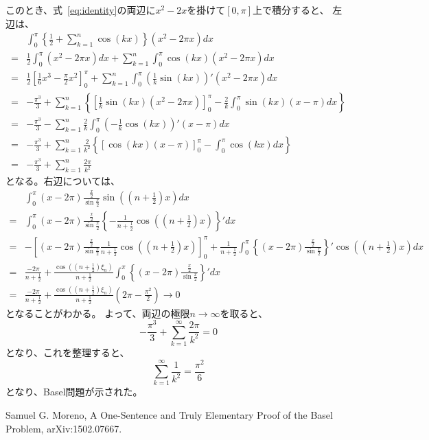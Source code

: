 \documentclass{jsarticle}
\begin{document}
このとき、式~\eqref{eq:identity}の両辺に$x^{2}-2x$を掛けて$[0,\pi]$上で積分すると、
左辺は、
\begin{align}
	&\int_{0}^{\pi}\left\{\frac{1}{2}+\sum_{k=1}^{n}\cos(kx)\right\}(x^{2}-2\pi x)dx\\
	=&\frac{1}{2}\int_{0}^{\pi}(x^{2}-2\pi x)dx+\sum_{k=1}^{n}\int_{0}^{\pi}\cos(kx)(x^2-2\pi x)dx\\
	=&\frac{1}{2}\left[\frac{1}{6}x^{3}-\frac{\pi}{2}x^{2}\right]_{0}^{\pi}
	+\sum_{k=1}^{n}\int_{0}^{\pi}\left(\frac{1}{k}\sin(kx)\right)'(x^{2}-2\pi x)dx\\
	=&-\frac{\pi^{3}}{3}
	+\sum_{k=1}^{n}\left\{\left[\frac{1}{k}\sin(kx)(x^2-2\pi x)\right]_{0}^{\pi}
	-\frac{2}{k}\int_{0}^{\pi}\sin(kx)(x-\pi)dx\right\}\\
	=&-\frac{\pi^{3}}{3}
	-\sum_{k=1}^{n}\frac{2}{k}\int_{0}^{\pi}\left(-\frac{1}{k}\cos(kx)\right)'(x-\pi)dx\\
	=&-\frac{\pi^{3}}{3}+\sum_{k=1}^{n}\frac{2}{k^{2}}
	\left\{\left[\cos(kx)(x-\pi)\right]_{0}^{\pi}
	-\int_{0}^{\pi}\cos(kx)dx
	\right\}\\
	=&-\frac{\pi^{3}}{3}+\sum_{k=1}^{n}\frac{2\pi}{k^{2}}
\end{align}
となる。右辺については、
\begin{align}
	&\int_{0}^{\pi}(x-2\pi)\frac{\frac{x}{2}}{\sin\frac{x}{2}}\sin\left(\left(n+\frac{1}{2}\right)x\right)dx\\
	=&\int_{0}^{\pi}(x-2\pi)\frac{\frac{x}{2}}{\sin\frac{x}{2}}\left\{-\frac{1}{n+\frac{1}{2}}\cos\left(\left(n+\frac{1}{2}\right)x\right)\right\}'dx\\
	=&-\left[(x-2\pi)\frac{\frac{x}{2}}{\sin\frac{x}{2}}\frac{1}{n+\frac{1}{2}}\cos\left(\left(n+\frac{1}{2}\right)x\right)\right]_{0}^{\pi}
	+\frac{1}{n+\frac{1}{2}}\int_{0}^{\pi}\left\{(x-2\pi)\frac{\frac{x}{2}}{\sin\frac{x}{2}}\right\}'\cos\left(\left(n+\frac{1}{2}\right)x\right)dx\\
	=&\frac{-2\pi}{n+\frac{1}{2}}
	+\frac{\cos\left(\left(n+\frac{1}{2}\right)\xi_{n}\right)}{n+\frac{1}{2}}
	\int_{0}^{\pi}\left\{(x-2\pi)\frac{\frac{x}{2}}{\sin\frac{x}{2}}\right\}'dx\\
	=&\frac{-2\pi}{n+\frac{1}{2}}
	+\frac{\cos\left(\left(n+\frac{1}{2}\right)\xi_{n}\right)}{n+\frac{1}{2}}\left(2\pi-\frac{\pi^{2}}{2}\right)\to0
\end{align}
となることがわかる。
よって、両辺の極限$n\to\infty$を取ると、
\begin{equation}
	-\frac{\pi^{3}}{3}+\sum_{k=1}^{\infty}\frac{2\pi}{k^{2}}=0
\end{equation}
となり、これを整理すると、
\begin{equation}
	\sum_{k=1}^{\infty}\frac{1}{k^{2}}=\frac{\pi^{2}}{6}
\end{equation}
となり、Basel問題が示された。


\begin{thebibliography}{9}
	Samuel G. Moreno,
	A One-Sentence and Truly Elementary Proof of the Basel Problem,
	arXiv:1502.07667.
\end{thebibliography}
\end{document}
